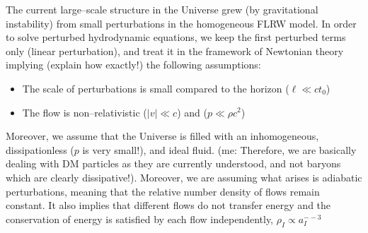 \documentclass[paper=a4, fontsize=11pt]{scrartcl} %
\numberwithin{equation}{section} %
\numberwithin{figure}{section} %
\numberwithin{table}{section} %
\begin{document}
The current large--scale structure in the Universe grew (by gravitational instability) from small perturbations in the homogeneous FLRW model. In order to solve perturbed hydrodynamic equations, we keep the first perturbed terms only (linear perturbation), and treat it in the framework of Newtonian theory implying (explain how exactly!) the following assumptions:
\begin{itemize}
\item The scale of perturbations is small compared to the horizon ($\ell \ll ct_0$)
\item The flow is non--relativistic ($|v| \ll c$) and ($p \ll \rho c^2$) 
\end{itemize}

Moreover, we assume that the Universe is filled with an inhomogeneous, dissipationless ($p$ is very small!), and ideal fluid. (me: Therefore, we are basically dealing with DM particles as they are currently understood, and not baryons which are clearly dissipative!). Moreover, we are assuming what arises is adiabatic perturbations, meaning that the relative number density of flows remain constant. It also implies that different flows do not transfer energy and the conservation of energy is satisfied by each flow independently, $\rho_I \propto a_I^{--3}$
\end{document}
